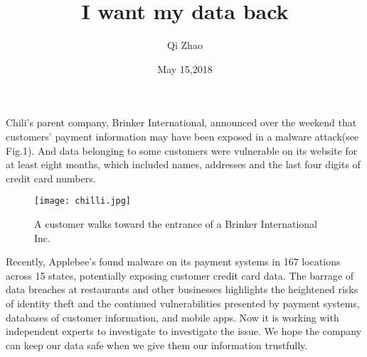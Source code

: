 \documentclass{article}
\author{Qi Zhao}
\date{May 15,2018}
\title{I want my data back}
\begin{document}
\maketitle
\par Chili's parent company, Brinker International, announced over the weekend that customers' payment information may have been exposed in a malware attack\cite{Khouzani2010Maximum}(see Fig.{\color{red}1}). And data belonging to some customers were vulnerable on its website for at least eight months, which included names, addresses and the last four digits of credit card numbers.
\begin{figure}[htbp]
\centering
\texttt{[image: chilli.jpg]}
\caption{A customer walks toward the entrance of a Brinker International Inc.}
\label{1}
\end{figure}
\par Recently, Applebee's found malware on its payment systems in 167 locations across 15 states, potentially exposing customer credit card data. The barrage of data breaches at restaurants and other businesses highlights the heightened risks of identity theft and the continued vulnerabilities presented by payment systems, databases of customer information, and mobile apps. Now it is working with independent experts to investigate to investigate the issue. We hope the company can keep our data safe when we give them our information trustfully.


\end{document}
